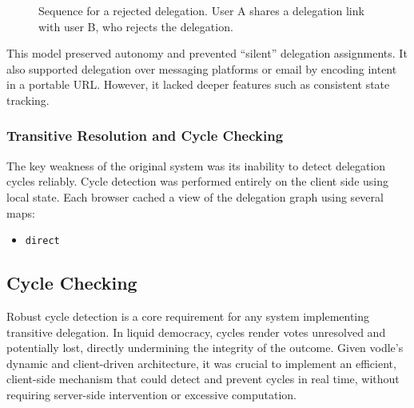\begin{figure}[H]
  \centering
  \caption{Sequence for a rejected delegation. User A shares a delegation link with user B, who rejects the delegation.}
  \label{fig:delegation-flow-reject}
\end{figure}

This model preserved autonomy and prevented ``silent'' delegation assignments. It also supported delegation over messaging platforms or email by encoding intent in a portable URL. However, it lacked deeper features such as consistent state tracking.
\subsubsection{Transitive Resolution and Cycle Checking}
The key weakness of the original system was its inability to detect delegation cycles reliably. Cycle detection was performed entirely on the client side using local state. Each browser cached a view of the delegation graph using several maps:
\begin{itemize}
  \item \texttt{direct}
\end{itemize}

\subsection{Cycle Checking}\label{subsec:obj1_cycle_checking}
Robust cycle detection is a core requirement for any system implementing transitive delegation. In liquid democracy, cycles render votes unresolved and potentially lost, directly undermining the integrity of the outcome. Given vodle's dynamic and client-driven architecture, it was crucial to implement an efficient, client-side mechanism that could detect and prevent cycles in real time, without requiring server-side intervention or excessive computation.

